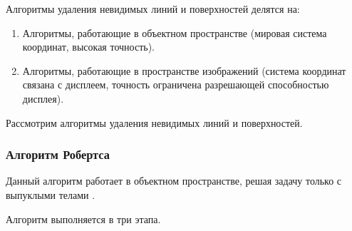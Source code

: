 Алгоритмы удаления невидимых линий и поверхностей делятся на:
\begin{enumerate}[label=\arabic*)]
	\item Алгоритмы, работающие в объектном пространстве (мировая система координат, высокая точность).
	\item Алгоритмы, работающие в пространстве изображений (система координат связана с дисплеем, точность ограничена разрешающей способностью дисплея).
\end{enumerate}
Рассмотрим алгоритмы удаления невидимых линий и поверхностей.

\subsubsection{Алгоритм Робертса}

Данный алгоритм работает в объектном пространстве, решая задачу только с выпуклыми телами \cite{rodgers}.

Алгоритм выполняется в три этапа.

